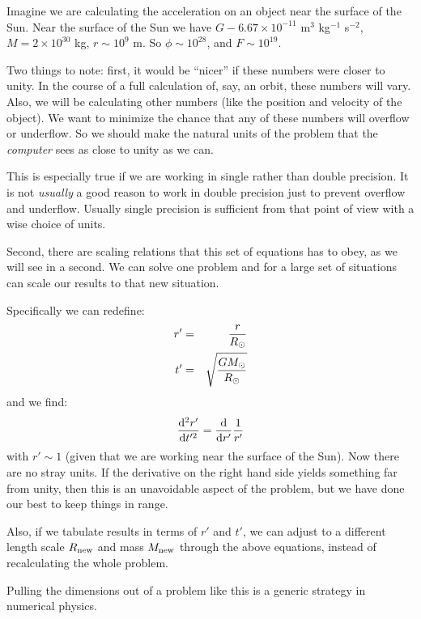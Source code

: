 Imagine we are calculating the acceleration on an object near the
surface of the Sun.  Near the surface of the Sun we have $G - 6.67
\times 10^{-11}$ m$^3$ kg$^{-1}$ s$^{-2}$, $M= 2\times 10^{30}$ kg, $r
\sim 10^9$ m. So $\phi \sim 10^{28}$, and $F\sim 10^{19}$.

Two things to note: first, it would be ``nicer'' if these numbers were
closer to unity. In the course of a full calculation of, say, an
orbit, these numbers will vary. Also, we will be calculating other
numbers (like the position and velocity of the object). We want to
minimize the chance that any of these numbers will overflow or
underflow. So we should make the natural units of the problem that the
{\it computer} sees as close to unity as we can.

This is especially true if we are working in single rather than double
precision. It is not {\it usually} a good reason to work in double
precision just to prevent overflow and underflow. Usually single
precision is sufficient from that point of view with a wise choice of
units.

Second, there are scaling relations that this set of equations has to
obey, as we will see in a second. We can solve one problem and for a
large set of situations can scale our results to that new situation.

Specifically we can redefine:
\begin{eqnarray}
r' &=& \frac{r}{R_\odot} \cr
t' &=& \sqrt{\frac{GM_\odot}{R_\odot}}
\end{eqnarray}
and we find:
\begin{equation}
\frac{{\rm d}^2r'}{{\rm d}t'^2} = 
\frac{{\rm d}}{{\rm d}r'} \frac{1}{r'}
\end{equation}
with $r' \sim 1$ (given that we are working near the surface of the
Sun). Now there are no stray units. If the derivative on the right
hand side yields something far from unity, then this is an unavoidable
aspect of the problem, but we have done our best to keep things in
range.

Also, if we tabulate results in terms of $r'$ and $t'$, we can adjust
to a different length scale $R_{\rm new}$ and mass $M_{\rm new}$
through the above equations, instead of recalculating the whole
problem.

Pulling the dimensions out of a problem like this is a generic
strategy in numerical physics.
